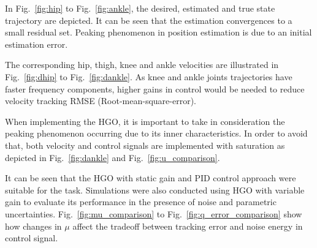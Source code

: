 \documentclass[letterpaper, 10 pt, conference]{ieeeconf}  %
\theoremstyle{plain}
\theoremstyle{definition}
\theoremstyle{remark}
\begin{document}
In Fig.~\ref{fig:hip} to Fig.~\ref{fig:ankle}, the desired, estimated and true state trajectory are depicted. It can be seen that the estimation convergences to a small residual set. Peaking phenomenon in position estimation is due to an initial estimation error.

The corresponding hip, thigh, knee and ankle velocities are illustrated in Fig.~\ref{fig:dhip} to Fig.~\ref{fig:dankle}. As knee and ankle joints trajectories have faster frequency components, higher gains in control would be needed to reduce velocity tracking RMSE (Root-mean-square-error).

When implementing the HGO, it is important to take in consideration the peaking phenomenon occurring due to its inner characteristics. In order to avoid that, both velocity and control signals are implemented with saturation as depicted in Fig.~\ref{fig:dankle} and Fig.~\ref{fig:u_comparison}.

It can be seen that the HGO with static gain and PID control approach were suitable for the task.
%
Simulations were also conducted using HGO with variable gain to evaluate its performance in the presence of noise and parametric uncertainties. Fig.~\ref{fig:mu_comparison} to Fig.~\ref{fig:q_error_comparison} show how changes in $\mu$ affect the tradeoff between tracking error and noise energy in control signal.
\end{document}

